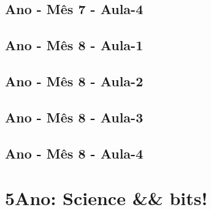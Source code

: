 \begin{multicols}{2}
\section[\sffamily 4\textordmasculine\space Ano - M\^{e}s 7 - Aula-4]{\textordmasculine\space Ano - M\^{e}s 7 - Aula-4}


\section[\sffamily 4\textordmasculine\space Ano - M\^{e}s 8 - Aula-1]{\textordmasculine\space Ano - M\^{e}s 8 - Aula-1}


\section[\sffamily 4\textordmasculine\space Ano - M\^{e}s 8 - Aula-2]{\textordmasculine\space Ano - M\^{e}s 8 - Aula-2}


\section[\sffamily 4\textordmasculine\space Ano - M\^{e}s 8 - Aula-3]{\textordmasculine\space Ano - M\^{e}s 8 - Aula-3}


\section[\sffamily 4\textordmasculine\space Ano - M\^{e}s 8 - Aula-4]{\textordmasculine\space Ano - M\^{e}s 8 - Aula-4}


\end{multicols}


\chapter[5\textordmasculine\space Ano: 
Science \&\& bits!]{5\textordmasculine\space Ano: Science \&\& bits!}\label{chap7}




\ClearWallPaper

\pagebreak

